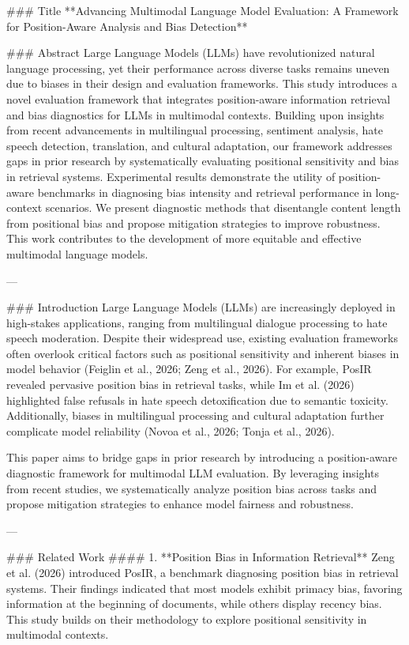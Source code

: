 ### Title  
**Advancing Multimodal Language Model Evaluation: A Framework for Position-Aware Analysis and Bias Detection**

### Abstract  
Large Language Models (LLMs) have revolutionized natural language processing, yet their performance across diverse tasks remains uneven due to biases in their design and evaluation frameworks. This study introduces a novel evaluation framework that integrates position-aware information retrieval and bias diagnostics for LLMs in multimodal contexts. Building upon insights from recent advancements in multilingual processing, sentiment analysis, hate speech detection, translation, and cultural adaptation, our framework addresses gaps in prior research by systematically evaluating positional sensitivity and bias in retrieval systems. Experimental results demonstrate the utility of position-aware benchmarks in diagnosing bias intensity and retrieval performance in long-context scenarios. We present diagnostic methods that disentangle content length from positional bias and propose mitigation strategies to improve robustness. This work contributes to the development of more equitable and effective multimodal language models.

---

### Introduction  
Large Language Models (LLMs) are increasingly deployed in high-stakes applications, ranging from multilingual dialogue processing to hate speech moderation. Despite their widespread use, existing evaluation frameworks often overlook critical factors such as positional sensitivity and inherent biases in model behavior (Feiglin et al., 2026; Zeng et al., 2026). For example, PosIR revealed pervasive position bias in retrieval tasks, while Im et al. (2026) highlighted false refusals in hate speech detoxification due to semantic toxicity. Additionally, biases in multilingual processing and cultural adaptation further complicate model reliability (Novoa et al., 2026; Tonja et al., 2026).

This paper aims to bridge gaps in prior research by introducing a position-aware diagnostic framework for multimodal LLM evaluation. By leveraging insights from recent studies, we systematically analyze position bias across tasks and propose mitigation strategies to enhance model fairness and robustness.

---

### Related Work  
#### 1. **Position Bias in Information Retrieval**  
Zeng et al. (2026) introduced PosIR, a benchmark diagnosing position bias in retrieval systems. Their findings indicated that most models exhibit primacy bias, favoring information at the beginning of documents, while others display recency bias. This study builds on their methodology to explore positional sensitivity in multimodal contexts.

